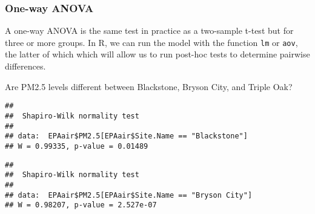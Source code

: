 \documentclass[]{article}
\newenvironment{Shaded}{\begin{snugshade}}{\end{snugshade}}
\newcommand{\KeywordTok}[1]{\textcolor[rgb]{0.13,0.29,0.53}{\textbf{#1}}}
\newcommand{\DecValTok}[1]{\textcolor[rgb]{0.00,0.00,0.81}{#1}}
\newcommand{\StringTok}[1]{\textcolor[rgb]{0.31,0.60,0.02}{#1}}
\newcommand{\OperatorTok}[1]{\textcolor[rgb]{0.81,0.36,0.00}{\textbf{#1}}}
\newcommand{\NormalTok}[1]{#1}
\begin{document}
\subsubsection{One-way ANOVA}\label{one-way-anova}

A one-way ANOVA is the same test in practice as a two-sample t-test but
for three or more groups. In R, we can run the model with the function
\texttt{lm} or \texttt{aov}, the latter of which which will allow us to
run post-hoc tests to determine pairwise differences.

Are PM2.5 levels different between Blackstone, Bryson City, and Triple
Oak?

\begin{Shaded}
\end{Shaded}

\begin{verbatim}
## 
##  Shapiro-Wilk normality test
## 
## data:  EPAair$PM2.5[EPAair$Site.Name == "Blackstone"]
## W = 0.99335, p-value = 0.01489
\end{verbatim}

\begin{Shaded}
\end{Shaded}

\begin{verbatim}
## 
##  Shapiro-Wilk normality test
## 
## data:  EPAair$PM2.5[EPAair$Site.Name == "Bryson City"]
## W = 0.98207, p-value = 2.527e-07
\end{verbatim}

\begin{Shaded}
\end{Shaded}
\end{document}

